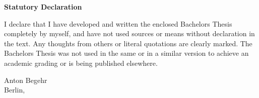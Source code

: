 \noindent
\textbf{Statutory Declaration}

\vspace{0.2cm}
\noindent
I declare that I have developed and written the enclosed Bachelors Thesis completely by myself, and have not used sources or means without declaration in the text. Any thoughts from others or literal quotations are clearly marked. The Bachelors Thesis was not used in the same or in a similar version to achieve an academic grading or is being published elsewhere.\\


\vspace{2.0cm}


\noindent
Anton Begehr\\
Berlin, \thesisData
